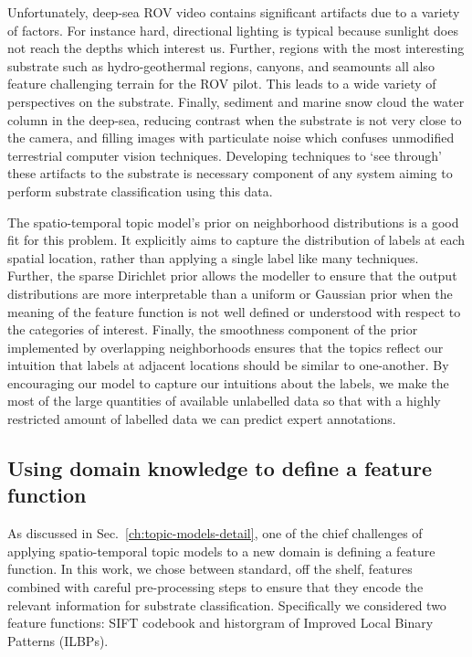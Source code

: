 Unfortunately, deep-sea ROV video contains significant artifacts due to a variety of factors. For instance hard, directional lighting is typical because sunlight does not reach the depths which interest us. Further, regions with the most interesting substrate such as hydro-geothermal regions, canyons, and seamounts all also feature challenging terrain for the ROV pilot. This leads to a wide variety of perspectives on the substrate. Finally, sediment and marine snow cloud the water column in the deep-sea, reducing contrast when the substrate is not very close to the camera, and filling images with particulate noise which confuses unmodified terrestrial computer vision techniques. Developing techniques to `see through' these artifacts to the substrate is necessary component of any system aiming to perform substrate classification using this data.

The spatio-temporal topic model's prior on neighborhood distributions is a good fit for this problem. It explicitly aims to capture the distribution of labels at each spatial location, rather than applying a single label like many techniques. Further, the sparse Dirichlet prior allows the modeller to ensure that the output distributions are more interpretable than a uniform or Gaussian prior when the meaning of the feature function is not well defined or understood with respect to the categories of interest. Finally, the smoothness component of the prior implemented by overlapping neighborhoods ensures that the topics reflect our intuition that labels at adjacent locations should be similar to one-another. By encouraging our model to capture our intuitions about the labels, we make the most of the large quantities of available unlabelled data so that with a highly restricted amount of labelled data we can predict expert annotations.

\subsection{Using domain knowledge to define a feature function}

As discussed in Sec.~\ref{ch:topic-models-detail}, one of the chief challenges of applying spatio-temporal topic models to a new domain is defining a feature function. In this work, we chose between standard, off the shelf, features combined with careful pre-processing steps to ensure that they encode the relevant information for substrate classification. Specifically we considered two feature functions: SIFT codebook and historgram of Improved Local Binary Patterns (ILBPs).

